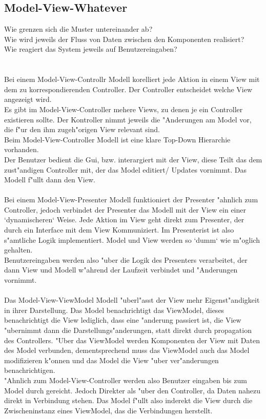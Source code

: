 \documentclass{article}
\newcommand{\gap}{\ \\ \\}
\begin{document}
\subsection{Model-View-Whatever}
Wie grenzen sich die Muster untereinander ab?\\
Wie wird jeweils der Fluss von Daten zwischen den Komponenten realisiert?\\
Wie reagiert das System jeweils auf Benutzereingaben?\\
\gap
Bei einem Model-View-Controllr Modell korelliert jede Aktion in einem View mit dem
    zu korrespondierenden Controller. Der Controller entscheidet welche View
    angezeigt wird.\\
Es gibt im Model-View-Controller mehere Views, zu denen je ein Controller 
    existieren sollte. Der Kontroller nimmt jeweils die "Anderungen am Model vor,
    die f"ur den ihm zugeh"origen View relevant sind.\\
Beim Model-View-Controller Modell ist eine klare Top-Down Hierarchie vorhanden.\\
Der Benutzer bedient die Gui, bzw. interargiert mit der View, diese Teilt das
    dem zust"andigen Controller mit, der das Model editiert/ Updates vornimmt.
    Das Modell f"ullt dann den View.\\
\\
Bei einem Model-View-Presenter Modell funktioniert der Presenter "ahnlich zum
    Controller, jedoch verbindet der Presenter das Modell mit der View ein einer
    `dynamischeren` Weise. Jede Aktion im View geht direkt zum Presenter, der
    durch ein Interface mit dem View Kommuniziert. Im Presenterist ist also 
    s"amtliche Logik implementiert. Model und View werden so `dumm` wie 
    m"oglich gehalten.\\
Benutzereingaben werden also "uber die Logik des Presenters verarbeitet, der dann
    View und Modell w"ahrend der Laufzeit verbindet und "Anderungen vornimmt.\\
\\
Das Model-View-ViewModel Modell "uberl"asst der View mehr Eigenst"andigkeit in 
    ihrer Darstellung. Das Model benachrichtigt das ViewModel, dieses
    benachrichtigt die View lediglich, dass
    eine "anderung passiert ist, die View "ubernimmt dann die 
    Darstellungs"anderungen, statt direkt durch propagation des Controllers. 
    "Uber das ViewModel werden Komponenten der View 
    mit Daten des Model verbunden, dementsprechend muss das ViewModel auch 
    das Model modifizieren k"onnen und das Model die View "uber ver"anderungen
    benachrichtigen.\\
"Ahnlich zum Model-View-Controller werden also Benutzer eingaben bis zum Model
    durch gereicht. Jedoch Direkter als "uber den Controller, da Daten nahezu
    direkt in Verbindung stehen. Das Model f"ullt also inderekt die View durch
    die Zwischeninstanz eines ViewModel, das die Verbindungen herstellt.\\
\end{document}
